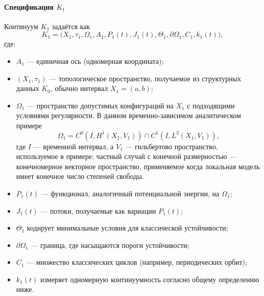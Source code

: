 \paragraph{Спецификация \texorpdfstring{\(K_1\)}{K\_1}}
Континуум \(K_1\) задаётся как
\[
    K_1 = \big(X_1,\tau_1,\Omega_1,A_1,P_1(t),J_1(t),\Theta_1,\partial\Omega_1,C_1,k_1(t)\big),
\]
где:
\begin{itemize}
    \item \(A_1\) — единичная ось (одномерная координата);
    \item \((X_1,\tau_1)\) — топологическое пространство, получаемое из структурных данных \(K_0\), обычно интервал \(X_1 = (a,b)\);
    \item \(\Omega_1\) — пространство допустимых конфигураций на \(X_1\) с подходящими условиями регулярности.
          В данном временно-зависимом аналитическом примере
          \[
              \Omega_1 = C^0(I,H^1(X_1,V_1)) \cap C^1(I,L^2(X_1,V_1)),
          \]
          где \(I\) — временной интервал, а \(V_1\) — гильбертово пространство,
          используемое в примере; частный случай с конечной размерностью —
          конечномерное векторное пространство, применяемое когда локальная модель
          имеет конечное число степеней свободы.
    \item \(P_1(t)\) — функционал, аналогичный потенциальной энергии, на \(\Omega_1\);
    \item \(J_1(t)\) — потоки, получаемые как вариации \(P_1(t)\);
    \item \(\Theta_1\) кодирует минимальные условия для классической устойчивости;
    \item \(\partial\Omega_1\) — граница, где насыщаются пороги устойчивости;
    \item \(C_1\) — множество классических циклов (например, периодических орбит);
    \item \(k_1(t)\) измеряет одномерную континуумность согласно общему определению ниже.
\end{itemize}

